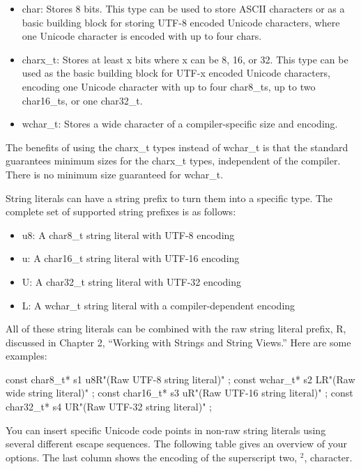 \begin{itemize}
\item
char: Stores 8 bits. This type can be used to store ASCII characters or as a basic building block for storing UTF-8 encoded Unicode characters, where one Unicode character is encoded with up to four chars.

\item
charx\_t: Stores at least x bits where x can be 8, 16, or 32. This type can be used as the basic building block for UTF-x encoded Unicode characters, encoding one Unicode character with up to four char8\_ts, up to two char16\_ts, or one char32\_t.

\item
wchar\_t: Stores a wide character of a compiler-specific size and encoding.
\end{itemize}

The benefits of using the charx\_t types instead of wchar\_t is that the standard guarantees minimum sizes for the charx\_t types, independent of the compiler. There is no minimum size guaranteed for wchar\_t.

String literals can have a string prefix to turn them into a specific type. The complete set of supported string prefixes is as follows:

\begin{itemize}
\item
u8: A char8\_t string literal with UTF-8 encoding

\item
u: A char16\_t string literal with UTF-16 encoding

\item
U: A char32\_t string literal with UTF-32 encoding

\item
L: A wchar\_t string literal with a compiler-dependent encoding
\end{itemize}

All of these string literals can be combined with the raw string literal prefix, R, discussed in Chapter 2, “Working with Strings and String Views.” Here are some examples:

\begin{cpp}
const char8_t* s1 { u8R"(Raw UTF-8 string literal)" };
const wchar_t* s2 { LR"(Raw wide string literal)" };
const char16_t* s3 { uR"(Raw UTF-16 string literal)" };
const char32_t* s4 { UR"(Raw UTF-32 string literal)" };
\end{cpp}

You can insert specific Unicode code points in non-raw string literals using several different escape sequences. The following table gives an overview of your options. The last column shows the encoding of the superscript two, $^2$, character.

